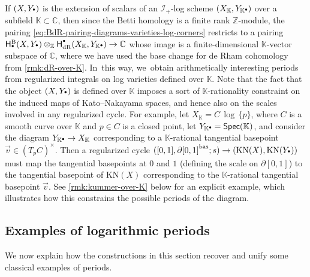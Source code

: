 \documentclass[10pt]{amsart}
\let\oldbullet\bullet
\renewcommand{\bullet}{{\raisebox{1pt}{$\scriptscriptstyle\oldbullet$}}}
\theoremstyle{definition}
\theoremstyle{remark}
\newenvironment{remark}
  {\pushQED{\qed}\renewcommand{\qedsymbol}{$\lozenge$}\remarkx}
  {\popQED\endremarkx}
\newcommand{\CC}{\mathbb{C}}
\newcommand{\KK}{\mathbb{K}}
\newcommand{\ZZ}{\mathbb{Z}}
\newcommand{\bas}[1]{{#1}^{\mathrm{bas}}}
\newcommand{\KN}[1]{\mathrm{KN}(#1)}
\newcommand{\Spec}[1]{\mathsf{Spec}(#1)}
\newcommand{\HdR}[2][\bullet]{\mathsf{H}_{\mathrm{dR}}^{#1}(#2)}
\newcommand{\HlgyB}[2][\bullet]{\mathsf{H}^{\mathrm{B}}_{#1}(#2)}
\newcommand{\ascat}{\mathscr{I}_+}
\begin{document}
\begin{remark}\label{rmk:periods-over-K}
If $(X,Y_\bullet)$ is the extension of scalars of an $\ascat$-log scheme $(X_\KK,Y_{\KK\bullet})$ over a subfield $\KK\subset \CC$, then since the Betti homology is a finite rank $\ZZ$-module, the pairing \eqref{eq:BdR-pairing-diagrams-varieties-log-corners} restricts to a pairing $\HlgyB{X,Y_\bullet} \otimes_\ZZ \HdR{X_\KK,Y_{\KK\bullet}} \to \CC$ whose image is a finite-dimensional $\KK$-vector subspace of $\CC$, where we have used the base change for de Rham cohomology from \autoref{rmk:dR-over-K}. In~this way, we~obtain arithmetically interesting periods from regularized integrals on log varieties defined over $\KK$. Note that the fact that the object $(X,Y_\bullet)$ is defined over $\KK$ imposes a sort of $\KK$-rationality constraint on the induced maps of Kato--Nakayama spaces, and hence also on the scales involved in any regularized cycle. For example, let $X_\KK=C\,\log\,\{p\}$, where $C$ is a smooth curve over $\KK$ and $p\in C$ is a closed point, let $Y_{\KK\bullet}=\Spec{\KK}$, and consider the diagram $Y_{\KK\bullet}\to X_\KK$ corresponding to a $\KK$-rational tangential basepoint $\vec{v}\in (T_pC)^\times$. Then a regularized cycle $([0,1],\bas{\partial[0,1]};s) \to (\KN{X},\KN{Y_\bullet})$ must map the tangential basepoints at $0$ and $1$ (defining the scale on $\partial[0,1]$) to the tangential basepoint of $\KN{X}$ corresponding to the $\KK$-rational tangential basepoint $\vec{v}$. See \autoref{rmk:kummer-over-K} below for an explicit example, which illustrates how this constrains the possible periods of the diagram.
\end{remark}

\subsection{Examples of logarithmic periods}\label{sec:period-examples}
We now explain how the constructions in this section recover and unify some classical examples of periods.
\end{document}
